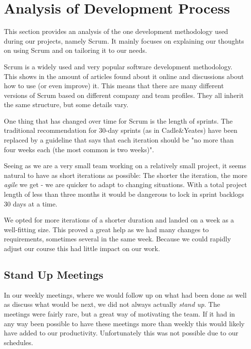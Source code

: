 \section{Analysis of Development Process}
This section provides an analysis of the one development methodology used during our projects, namely Scrum. It mainly focuses on explaining our thoughts on using Scrum and on tailoring it to our needs.
\label{sec:AnalysisOrganizational}

Scrum is a widely used and very popular software development methodology. This shows in the amount
of articles found about it online and discussions about how to use (or even improve) it. This means
that there are many different versions of Scrum based on different company and team profiles. They
all inherit the same structure, but some details vary.

One thing that has changed over time for Scrum is the length of sprints. The traditional recommendation
for 30-day sprints (as in Cadle\&Yeates\cite[ch.~6.3.3]{caye}) have been replaced by a guideline that says that
each iteration should be "no more than four weeks each (the most common is two weeks)"\cite{scrumprime}.

Seeing as we are a very small team working on a relatively small project, it seems natural to have as 
short iterations as possible: The shorter the iteration, the more \emph{agile} we get - we are quicker
to adapt to changing situations. With a total project length of less than three months it would be
dangerous to lock in sprint backlogs 30 days at a time.

We opted for more iterations of a shorter duration and landed on a week as a well-fitting size. This
proved a great help as we had many changes to requirements, sometimes several in the same week. Because
we could rapidly adjust our course this had little impact on our work.

\subsection{Stand Up Meetings}

In our weekly meetings, where we would follow up on what had been done as well as discuss what would be
next, we did not always actually \emph{stand up}. The meetings were fairly rare, but a great way of
motivating the team. If it had in any way been possible to have these meetings more than weekly this would
likely have added to our productivity. Unfortunately this was not possible due to our schedules.

